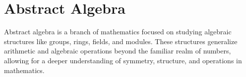 \chapter{Abstract Algebra}
\thispagestyle{fancy}

Abstract algebra is a branch of mathematics focused on studying algebraic structures like groups, rings, fields, and modules. These structures generalize arithmetic and algebraic operations beyond the familiar realm of numbers, allowing for a deeper understanding of symmetry, structure, and operations in mathematics.

